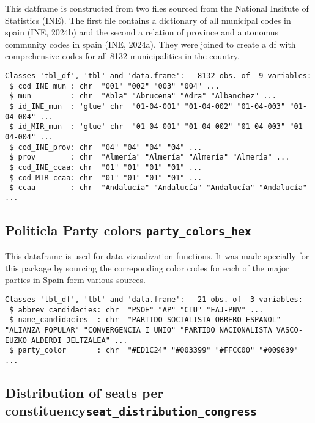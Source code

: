 \documentclass[
  letterpaper,
  DIV=11,
  numbers=noendperiod]{scrreprt}
\begin{document}
This datframe is constructed from two files sourced from the National
Insitute of Statistics (INE). The first file contains a dictionary of
all municipal codes in spain (INE, 2024b) and the second a relation of
province and autonomus community codes in spain (INE, 2024a). They were
joined to create a df with comprehensive codes for all 8132
municipalities in the country.

\begin{verbatim}
Classes 'tbl_df', 'tbl' and 'data.frame':   8132 obs. of  9 variables:
 $ cod_INE_mun : chr  "001" "002" "003" "004" ...
 $ mun         : chr  "Abla" "Abrucena" "Adra" "Albanchez" ...
 $ id_INE_mun  : 'glue' chr  "01-04-001" "01-04-002" "01-04-003" "01-04-004" ...
 $ id_MIR_mun  : 'glue' chr  "01-04-001" "01-04-002" "01-04-003" "01-04-004" ...
 $ cod_INE_prov: chr  "04" "04" "04" "04" ...
 $ prov        : chr  "Almería" "Almería" "Almería" "Almería" ...
 $ cod_INE_ccaa: chr  "01" "01" "01" "01" ...
 $ cod_MIR_ccaa: chr  "01" "01" "01" "01" ...
 $ ccaa        : chr  "Andalucía" "Andalucía" "Andalucía" "Andalucía" ...
\end{verbatim}

\hypertarget{politicla-party-colors-party_colors_hex}{%
\subsection{\texorpdfstring{Politicla Party colors
\texttt{party\_colors\_hex}}{Politicla Party colors party\_colors\_hex}}\label{politicla-party-colors-party_colors_hex}}

This dataframe is used for data vizualization functions. It was made
specially for this package by sourcing the correponding color codes for
each of the major parties in Spain form various sources.

\begin{verbatim}
Classes 'tbl_df', 'tbl' and 'data.frame':   21 obs. of  3 variables:
 $ abbrev_candidacies: chr  "PSOE" "AP" "CIU" "EAJ-PNV" ...
 $ name_candidacies  : chr  "PARTIDO SOCIALISTA OBRERO ESPANOL" "ALIANZA POPULAR" "CONVERGENCIA I UNIO" "PARTIDO NACIONALISTA VASCO-EUZKO ALDERDI JELTZALEA" ...
 $ party_color       : chr  "#ED1C24" "#003399" "#FFCC00" "#009639" ...
\end{verbatim}

\hypertarget{distribution-of-seats-per-constituencyseat_distribution_congress}{%
\subsection{\texorpdfstring{Distribution of seats per
constituency\texttt{seat\_distribution\_congress}}{Distribution of seats per constituencyseat\_distribution\_congress}}\label{distribution-of-seats-per-constituencyseat_distribution_congress}}
\end{document}
